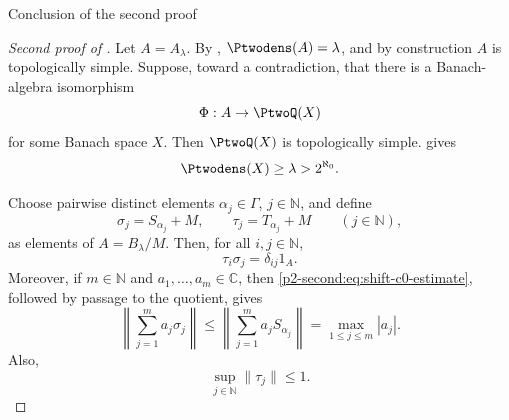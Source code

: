 \documentclass[11pt,reqno]{amsart}
\makeatletter
\theoremstyle{plain}
\theoremstyle{definition}
\newcommand{\N}{\mathbb N}
\newcommand{\C}{\mathbb C}
\newcounter{problempaper}
\newenvironment{problempaperbody}{%
  \setcounter{subsection}{0}%
  \setcounter{subsubsection}{0}%
  \setcounter{paragraph}{0}%
  \renewcommand{\thesubsection}{\arabic{subsection}}%
  \renewcommand{\thesubsubsection}{\thesubsection.\arabic{subsubsection}}%
  \renewcommand{\theparagraph}{\thesubsubsection.\arabic{paragraph}}%
  \let\problem@outersection\section
  \let\problem@outersubsection\subsection
  \let\problem@outersubsubsection\subsubsection
  \let\problem@outerparagraph\paragraph
  \let\section\problem@papersection
  \let\subsection\problem@papersubsection
  \let\subsubsection\problem@papersubsubsection
}{%
  \let\section\problem@outersection
  \let\subsection\problem@outersubsection
  \let\subsubsection\problem@outersubsubsection
  \let\paragraph\problem@outerparagraph
}
\newcommand{\problem@target}[2]{%
  \hypertarget{problem-\theproblempaper-#1-#2}{}%
}
\newcommand{\problem@paperheading}[3]{%
  \par\bigskip
  \problem@target{#1}{#2}%
  \noindent{\large\bfseries #2.\quad #3\par}%
  \nobreak\smallskip
}
\newcommand{\problem@papersubheading}[3]{%
  \par\medskip
  \problem@target{#1}{#2}%
  \noindent{\normalsize\bfseries #2.\quad #3\par}%
  \nobreak\smallskip
}
\newcommand{\problem@papersubsubheading}[3]{%
  \par\smallskip
  \problem@target{#1}{#2}%
  \noindent{\normalsize\itshape #2.\quad #3.\ }%
}
\def\problem@papersection{%
  \@ifstar{\problem@papersectionstar}{\problem@papersectionnostar}%
}
\def\problem@papersectionstar#1{%
  \par\bigskip\noindent{\large\bfseries #1\par}\nobreak\smallskip
}
\def\problem@papersectionnostar#1{%
  \refstepcounter{subsection}%
  \setcounter{subsubsection}{0}%
  \setcounter{paragraph}{0}%
  \problem@paperheading{section}{\thesubsection}{#1}%
  \problem@writecontentsline{section}{\thesubsection}{#1}%
}
\def\problem@papersubsection{%
  \@ifstar{\problem@papersubsectionstar}{\problem@papersubsectionnostar}%
}
\def\problem@papersubsectionstar#1{%
  \par\medskip\noindent{\normalsize\bfseries #1\par}\nobreak\smallskip
}
\def\problem@papersubsectionnostar#1{%
  \refstepcounter{subsubsection}%
  \setcounter{paragraph}{0}%
  \problem@papersubheading{subsection}{\thesubsubsection}{#1}%
  \problem@writecontentsline{subsection}{\thesubsubsection}{#1}%
}
\def\problem@papersubsubsection{%
  \@ifstar{\problem@papersubsubsectionstar}{\problem@papersubsubsectionnostar}%
}
\def\problem@papersubsubsectionstar#1{%
  \par\smallskip\noindent{\normalsize\itshape #1.\ }%
}
\def\problem@papersubsubsectionnostar#1{%
  \refstepcounter{paragraph}%
  \problem@papersubsubheading{subsubsection}{\theparagraph}{#1}%
  \problem@writecontentsline{subsubsection}{\theparagraph}{#1}%
}
\newcommand{\problem@writecontentsline}[3]{%
  \begingroup
  \protected@write\@auxout{}{%
    \string\problemcontentsentry{\theproblempaper}{#1}{#2}{#3}{\thepage}%
  }%
  \endgroup
}
\newcommand{\problemcontentsentry}[5]{%
  \@ifundefined{problemcontents@#1}{%
    \expandafter\gdef\csname problemcontents@#1\endcsname{}%
  }{}%
  \expandafter\g@addto@macro\csname problemcontents@#1\endcsname{%
    \problemcontentsline{#1}{#2}{#3}{#4}{#5}%
  }%
}
\newcommand{\problemcontentslink}[4]{%
  \hyperlink{problem-#1-#2-#3}{#4}%
}
\newcommand{\problemcontentsline}[5]{%
  \ifstrequal{#2}{section}{%
    \par\noindent
    \problemcontentslink{#1}{#2}{#3}{\makebox[2.5em][l]{#3}#4}%
    \nobreak\dotfill
    \problemcontentslink{#1}{#2}{#3}{#5}\par
  }{%
    \ifstrequal{#2}{subsection}{%
      \par\noindent\hspace*{1.5em}%
      \problemcontentslink{#1}{#2}{#3}{\makebox[3.5em][l]{#3}#4}%
      \nobreak\dotfill
      \problemcontentslink{#1}{#2}{#3}{#5}\par
    }{%
      \par\noindent\hspace*{3em}%
      \problemcontentslink{#1}{#2}{#3}{\makebox[4.5em][l]{#3}#4}%
      \nobreak\dotfill
      \problemcontentslink{#1}{#2}{#3}{#5}\par
    }%
  }%
}
\makeatother
\begin{document}
\begin{problempaperbody}
\subsection{Conclusion of the second proof}
\label{p2-second:sec:second-conclusion}

\begin{proof}[Second proof of ]
Let $A=A_\lambda$. By , $\Ptwodens(A)=\lambda$, and by construction $A$ is topologically simple. Suppose, toward a contradiction, that there is a Banach-algebra isomorphism
\begin{equation*}
        \Phi:A\to\PtwoQ(X)
\end{equation*}
for some Banach space $X$. Then $\PtwoQ(X)$ is topologically simple.  gives
\begin{equation*}
        \Ptwodens(X)\geq\lambda>2^{\aleph_0}.
\end{equation*}

Choose pairwise distinct elements $\alpha_j\in\Gamma$, $j\in\N$, and define
\begin{equation*}
        \sigma_j=S_{\alpha_j}+M, \qquad \tau_j=T_{\alpha_j}+M \qquad(j\in\N),
\end{equation*}
as elements of $A=B_\lambda/M$. Then, for all $i,j\in\N$,
\begin{equation*}
        \tau_i\sigma_j=\delta_{ij}1_A.
\end{equation*}
Moreover, if $m\in\N$ and $a_1,\ldots,a_m\in\C$, then \eqref{p2-second:eq:shift-c0-estimate}, followed by passage to the quotient, gives
\begin{equation*}
        \left\|\sum_{j=1}^{m}a_j\sigma_j\right\|
        \leq
        \left\|\sum_{j=1}^{m}a_jS_{\alpha_j}\right\|
        =
        \max_{1\leq j\leq m}|a_j|.
\end{equation*}
Also,
\begin{equation*}
        \sup_{j\in\N}\|\tau_j\|\leq1.
\end{equation*}


\end{proof}
\end{problempaperbody}
\end{document}
